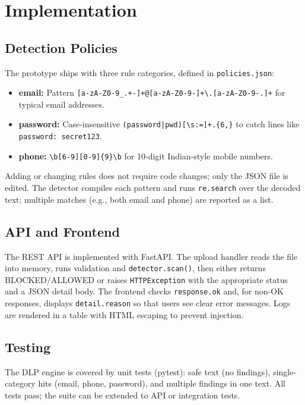 \documentclass[11pt,a4paper]{article}
\begin{document}
\section{Implementation}
\label{sec:impl}

\subsection{Detection Policies}

The prototype ships with three rule categories, defined in \texttt{policies.json}:

\begin{itemize}
  \item \textbf{email:} Pattern \texttt{[a-zA-Z0-9\_.+-]+@[a-zA-Z0-9-]+\textbackslash.[a-zA-Z0-9-.]+} for typical email addresses.
  \item \textbf{password:} Case-insensitive \texttt{(password|pwd)[\textbackslash s:=]+.\{6,\}} to catch lines like \texttt{password: secret123}.
  \item \textbf{phone:} \texttt{\textbackslash b[6-9][0-9]\{9\}\textbackslash b} for 10-digit Indian-style mobile numbers.
\end{itemize}

Adding or changing rules does not require code changes; only the JSON file is edited. The detector compiles each pattern and runs \texttt{re.search} over the decoded text; multiple matches (e.g., both email and phone) are reported as a list.

\subsection{API and Frontend}

The REST API is implemented with FastAPI. The upload handler reads the file into memory, runs validation and \texttt{detector.scan()}, then either returns BLOCKED/ALLOWED or raises \texttt{HTTPException} with the appropriate status and a JSON detail body. The frontend checks \texttt{response.ok} and, for non-OK responses, displays \texttt{detail.reason} so that users see clear error messages. Logs are rendered in a table with HTML escaping to prevent injection.

\subsection{Testing}

The DLP engine is covered by unit tests (pytest): safe text (no findings), single-category hits (email, phone, password), and multiple findings in one text. All tests pass; the suite can be extended to API or integration tests.
\end{document}
